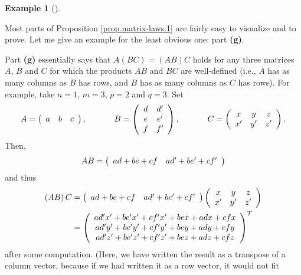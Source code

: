 \documentclass[numbers=enddot,12pt,final,onecolumn,notitlepage]{scrartcl}%
\theoremstyle{definition}
\newtheorem{exam}[theo]{Example}
\newenvironment{example}[1][]
{\begin{exam}[#1]\begin{leftbar}}
{\end{leftbar}\end{exam}}
\begin{document}
\begin{example}
Most parts of Proposition \ref{prop.matrix-laws.1} are fairly easy to
visualize and to prove. Let me give an example for the least obvious one: part
\textbf{(g)}.

Part \textbf{(g)} essentially says that $A\left(  BC\right)  =\left(
AB\right)  C$ holds for any three matrices $A$, $B$ and $C$ for which the
products $AB$ and $BC$ are well-defined (i.e., $A$ has as many columns as $B$
has rows, and $B$ has as many columns as $C$ has rows). For example, take
$n=1$, $m=3$, $p=2$ and $q=3$. Set%
\[
A=\left(
\begin{array}
[c]{ccc}%
a & b & c
\end{array}
\right)  ,\ \ \ \ \ \ \ \ \ \ B=\left(
\begin{array}
[c]{cc}%
d & d^{\prime}\\
e & e^{\prime}\\
f & f^{\prime}%
\end{array}
\right)  ,\ \ \ \ \ \ \ \ \ \ C=\left(
\begin{array}
[c]{ccc}%
x & y & z\\
x^{\prime} & y^{\prime} & z^{\prime}%
\end{array}
\right)  .
\]
Then,%
\[
AB=\left(
\begin{array}
[c]{cc}%
ad+be+cf & ad^{\prime}+be^{\prime}+cf^{\prime}%
\end{array}
\right)
\]
and thus%
\begin{align*}
\left(  AB\right)  C  &  =\left(
\begin{array}
[c]{cc}%
ad+be+cf & ad^{\prime}+be^{\prime}+cf^{\prime}%
\end{array}
\right)  \left(
\begin{array}
[c]{ccc}%
x & y & z\\
x^{\prime} & y^{\prime} & z^{\prime}%
\end{array}
\right) \\
&  =\left(
\begin{array}
[c]{c}%
ad^{\prime}x^{\prime}+be^{\prime}x^{\prime}+cf^{\prime}x^{\prime
}+bex+adx+cfx\\
ad^{\prime}y^{\prime}+be^{\prime}y^{\prime}+cf^{\prime}y^{\prime
}+bey+ady+cfy\\
ad^{\prime}z^{\prime}+be^{\prime}z^{\prime}+cf^{\prime}z^{\prime}+bez+adz+cfz
\end{array}
\right)  ^{T}%
\end{align*}
after some computation. (Here, we have written the result as a transpose of a
column vector, because if we had written it as a row vector, it would not fit

\end{example}
\end{document}
